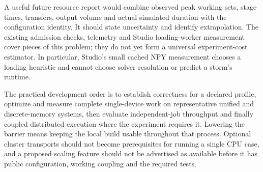 A useful future resource report would combine observed peak working sets,
stage times, transfers, output volume and actual simulated duration with the
configuration identity. It should state uncertainty and identify extrapolation.
The existing admission checks, telemetry and Studio loading-worker measurement
cover pieces of this problem; they do not yet form a universal experiment-cost
estimator. In particular, Studio's small cached NPY measurement chooses a
loading heuristic and cannot choose solver resolution or predict a storm's
runtime.

The practical development order is to establish correctness for a declared
profile, optimize and measure complete single-device work on representative
unified and discrete-memory systems, then evaluate independent-job throughput and finally
coupled distributed execution where the experiment requires it. Lowering the
barrier means keeping the local build usable throughout that process. Optional
cluster transports should not become prerequisites for running a single CPU
case, and a proposed scaling feature should not be advertised as available
before it has public configuration, working coupling and the required tests.
